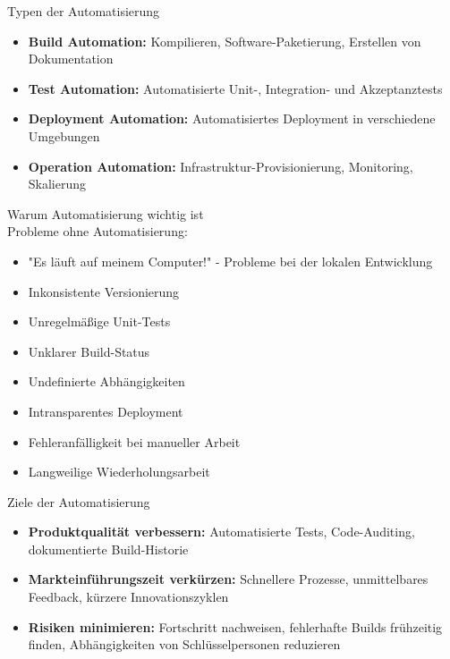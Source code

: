 \begin{concept}{Typen der Automatisierung}\\
    \begin{itemize}
        \item \textbf{Build Automation:} Kompilieren, Software-Paketierung, Erstellen von Dokumentation
        \item \textbf{Test Automation:} Automatisierte Unit-, Integration- und Akzeptanztests
        \item \textbf{Deployment Automation:} Automatisiertes Deployment in verschiedene Umgebungen
        \item \textbf{Operation Automation:} Infrastruktur-Provisionierung, Monitoring, Skalierung
    \end{itemize}
\end{concept}

\begin{concept}{Warum Automatisierung wichtig ist}\\
    Probleme ohne Automatisierung:
    \begin{itemize}
        \item "Es läuft auf meinem Computer!" - Probleme bei der lokalen Entwicklung
        \item Inkonsistente Versionierung
        \item Unregelmäßige Unit-Tests
        \item Unklarer Build-Status
        \item Undefinierte Abhängigkeiten
        \item Intransparentes Deployment
        \item Fehleranfälligkeit bei manueller Arbeit
        \item Langweilige Wiederholungsarbeit
    \end{itemize}
\end{concept}

\begin{concept}{Ziele der Automatisierung}\\
    \begin{itemize}
        \item \textbf{Produktqualität verbessern:} Automatisierte Tests, Code-Auditing, dokumentierte Build-Historie
        \item \textbf{Markteinführungszeit verkürzen:} Schnellere Prozesse, unmittelbares Feedback, kürzere Innovationszyklen
        \item \textbf{Risiken minimieren:} Fortschritt nachweisen, fehlerhafte Builds frühzeitig finden, Abhängigkeiten von Schlüsselpersonen reduzieren
    \end{itemize}
\end{concept}

